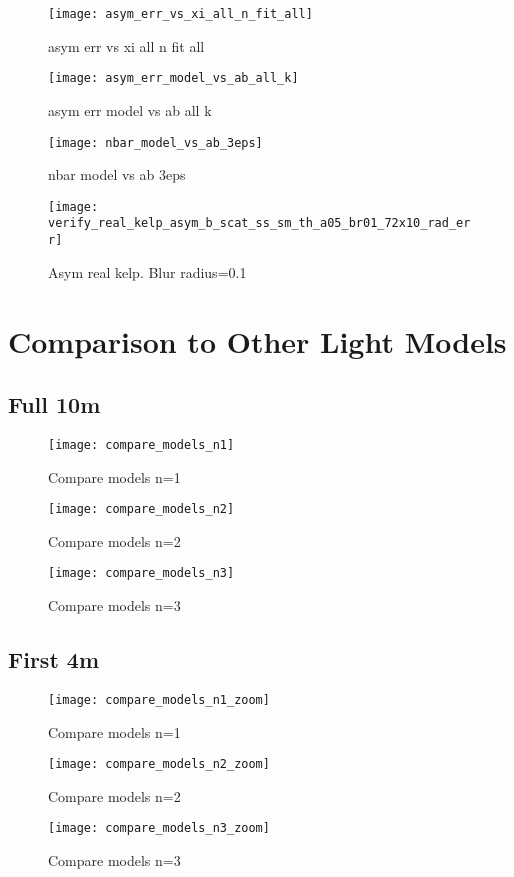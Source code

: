 \begin{figure}[H]
  \centering
  \texttt{[image: asym\_err\_vs\_xi\_all\_n\_fit\_all]}
  \caption{asym err vs xi all n fit all}
  \label{fig:asym_err_vs_xi_all_n_fit_all}
\end{figure}

\begin{figure}[H]
  \centering
  \texttt{[image: asym\_err\_model\_vs\_ab\_all\_k]}
  \caption{asym err model vs ab all k}
  \label{fig:asym_err_model_vs_ab_all_k}
\end{figure}

\begin{figure}[H]
  \centering
  \texttt{[image: nbar\_model\_vs\_ab\_3eps]}
  \caption{nbar model vs ab 3eps}
  \label{fig:nbar_model_vs_ab_3eps}
\end{figure}

\begin{figure}[H]
  \centering
  \texttt{[image: verify\_real\_kelp\_asym\_b\_scat\_ss\_sm\_th\_a05\_br01\_72x10\_rad\_err]}
  \caption{Asym real kelp. Blur radius=0.1}
  \label{fig:asym_real_kelp_br01}
\end{figure}

\section{Comparison to Other Light Models}


\subsection{Full 10m}
\begin{figure}[H]
  \centering
  \texttt{[image: compare\_models\_n1]}
  \caption{Compare models n=1}
  \label{fig:compare_models_n1}
\end{figure}
\begin{figure}[H]
  \centering
  \texttt{[image: compare\_models\_n2]}
  \caption{Compare models n=2}
  \label{fig:compare_models_n2}
\end{figure}
\begin{figure}[H]
  \centering
  \texttt{[image: compare\_models\_n3]}
  \caption{Compare models n=3}
  \label{fig:compare_models_n3}
\end{figure}

\subsection{First 4m}
\begin{figure}[H]
  \centering
  \texttt{[image: compare\_models\_n1\_zoom]}
  \caption{Compare models n=1}
  \label{fig:compare_models_n1}
\end{figure}
\begin{figure}[H]
  \centering
  \texttt{[image: compare\_models\_n2\_zoom]}
  \caption{Compare models n=2}
  \label{fig:compare_models_n2}
\end{figure}
\begin{figure}[H]
  \centering
  \texttt{[image: compare\_models\_n3\_zoom]}
  \caption{Compare models n=3}
  \label{fig:compare_models_n3}
\end{figure}

